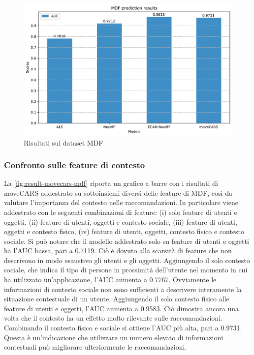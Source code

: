 \documentclass[12pt,italian]{report}
\begin{document}
\begin{figure}
  \centering
  \includegraphics[width=\linewidth]{immagini/mdf_test_results.pdf}
  \caption{Risultati sul dataset MDF}
  \label{fig:result-mdf}
\end{figure}

\subsubsection{Confronto sulle feature di contesto}
La \autoref{fig:result-movecars-mdf} riporta un grafico a barre con i risultati di moveCARS addestrato su sottoinsiemi diversi delle feature di MDF, così da valutare l'importanza del contesto nelle raccomandazioni. In particolare viene addestrato con le seguenti combinazioni di feature: (i) solo feature di utenti e oggetti, (ii) feature di utenti, oggetti e contesto sociale, (iii) feature di utenti, oggetti e contesto fisico, (iv) feature di utenti, oggetti, contesto fisico e contesto sociale. Si può notare che il modello addestrato solo su feature di utenti e oggetti ha l'AUC bassa, pari a 0.7119. Ciò è dovuto alla scarsità di feature che non descrivono in modo esaustivo gli utenti e gli oggetti. Aggiungendo il solo contesto sociale, che indica il tipo di persone in prossimità dell'utente nel momento in cui ha utilizzato un'applicazione, l'AUC aumenta a 0.7767. Ovviamente le informazioni di contesto sociale non sono sufficienti a descrivere interamente la situazione contestuale di un utente. Aggiungendo il solo contesto fisico alle feature di utenti e oggetti, l'AUC aumenta a 0.9583. Ciò dimostra ancora una volta che il contesto ha un effetto molto rilevante sulle raccomandazioni. Combinando il contesto fisico e sociale si ottiene l'AUC più alta, pari a 0.9731. Questa è un'indicazione che utilizzare un numero elevato di informazioni contestuali può migliorare ulteriormente le raccomandazioni.
\end{document}
